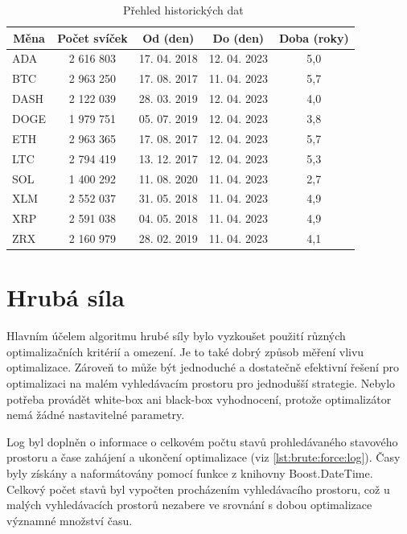 \begin{table}[!htbp]
\centering
\caption[Přehled vybraných historických dat]{~Přehled historických dat}\label{tab:historical:market:data}
{%
\begin{tabular}{|l|c|c|c|c|}
\hline
\multicolumn{1}{|c|}{\textbf{Měna}} & \textbf{Počet svíček} & \textbf{Od (den)} & \textbf{Do (den)} & \textbf{Doba (roky)} \\ \hline
ADA  & 2 616 803 & 17. 04. 2018 & 12. 04. 2023 & 5,0 \\ \hline
BTC  & 2 963 250 & 17. 08. 2017 & 11. 04. 2023 & 5,7 \\ \hline
DASH & 2 122 039 & 28. 03. 2019 & 12. 04. 2023 & 4,0 \\ \hline
DOGE & 1 979 751 & 05. 07. 2019 & 12. 04. 2023 & 3,8 \\ \hline
ETH  & 2 963 365 & 17. 08. 2017 & 12. 04. 2023 & 5,7 \\ \hline
LTC  & 2 794 419 & 13. 12. 2017 & 12. 04. 2023 & 5,3 \\ \hline
SOL  & 1 400 292 & 11. 08. 2020 & 11. 04. 2023 & 2,7 \\ \hline
XLM  & 2 552 037 & 31. 05. 2018 & 11. 04. 2023 & 4,9 \\ \hline
XRP  & 2 591 038 & 04. 05. 2018 & 11. 04. 2023 & 4,9 \\ \hline
ZRX  & 2 160 979 & 28. 02. 2019 & 11. 04. 2023 & 4,1 \\ \hline
\end{tabular}%
}
\end{table}

\section{Hrubá síla}
Hlavním účelem algoritmu hrubé síly bylo vyzkoušet použití různých optimalizačních kritérií a omezení.
Je to také dobrý způsob měření vlivu optimalizace.
Zároveň to může být jednoduché a dostatečně efektivní řešení pro optimalizaci na malém vyhledávacím prostoru pro jednodušší strategie.
Nebylo potřeba provádět white-box ani black-box vyhodnocení, protože optimalizátor nemá žádné nastavitelné parametry.

Log byl doplněn o informace o celkovém počtu stavů prohledávaného stavového prostoru a čase zahájení a ukončení optimalizace (viz \ref{lst:brute:force:log}).
Časy byly získány a naformátovány pomocí funkce z knihovny Boost.DateTime.
Celkový počet stavů byl vypočten procházením vyhledávacího prostoru, což u malých vyhledávacích prostorů nezabere ve srovnání s dobou optimalizace významné množství času.

